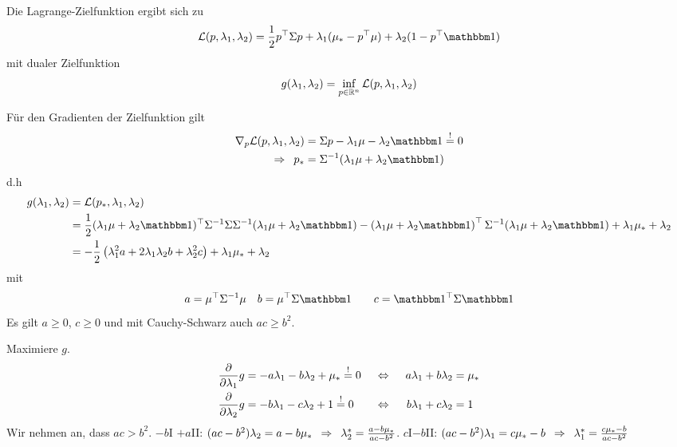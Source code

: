 Die Lagrange-Zielfunktion ergibt sich zu 
\begin{equation*}
	\mathcal{L}(p,\lambda_1,\lambda_2) = \frac{1}{2} \trans{p} \Sigma p + \lambda_1 (\mu_\ast - \trans{p} \mu) + \lambda_2 (1-\trans{p} \one)
\end{equation*}
mit dualer Zielfunktion
\begin{equation*}
	g(\lambda_1, \lambda_2) = \inf_{p \in \mathbb{R}^n} \mathcal{L}(p, \lambda_1, \lambda_2)
\end{equation*}

Für den Gradienten der Zielfunktion gilt
\begin{equation*}
	\begin{aligned}
		\nabla_p \mathcal{L}(p, \lambda_1, \lambda_2) &= \Sigma p - \lambda_1 \mu - \lambda_2 \one \overset{!}{=} 0 \\
		\follows p_\ast &= \Sigma^{-1} (\lambda_1 \mu + \lambda_2 \one)
	\end{aligned}
\end{equation*}
d.h 
\begin{align*}
	g(\lambda_1, \lambda_2) 
	&= \mathcal{L}(p_\ast, \lambda_1, \lambda_2) \\
	&= \frac{1}{2} \trans{(\lambda_1 \mu + \lambda_2 \one)} \Sigma^{-1} \Sigma \Sigma^{-1} (\lambda_1 \mu + \lambda_2 \one) - \transpose{\lambda_1 \mu + \lambda_2 \one} \Sigma^{-1} (\lambda_1 \mu + \lambda_2 \one) + \lambda_1 \mu_\ast + \lambda_2 \\
	&= -\frac{1}{2} \brackets{\lambda_1^2 a + 2 \lambda_1 \lambda_2 b + \lambda_2^2 c} + \lambda_1 \mu_\ast + \lambda_2
\end{align*}
mit
\begin{equation*}
	a = \trans{\mu} \Sigma^{-1} \mu \quad b = \trans{\mu} \Sigma \one \qquad c = \trans{\one} \Sigma \one
\end{equation*}
Es gilt $a \ge 0$, $c \ge 0$ und mit Cauchy-Schwarz auch $ac \ge b^2$.

Maximiere $g$.
\begin{align*}
	\frac{\partial}{\partial \lambda_1 } g &= -a \lambda_1 - b \lambda_2 + \mu_\ast \overset{!}{=} 0 &\enskip \Leftrightarrow \enskip&& a \lambda_1 + b \lambda_2 &= \mu_\ast \\
	\frac{\partial}{\partial \lambda_2 } g &= -b \lambda_1 -c \lambda_2 + 1 \overset{!}{=} 0 &\enskip \Leftrightarrow \enskip&& b \lambda_1 + c \lambda_2 &= 1
\end{align*}
Wir nehmen an, dass $ac > b^2$.
$-b$I $+a$II: $(ac - b^2) \lambda_2 = a - b \mu_\ast \enskip \Rightarrow \enskip \lambda_2^\ast = \frac{a - b \mu_\ast}{ac - b^2}$.
$c$I$-b$II: $(ac - b^2) \lambda_1 = c\mu_\ast - b \enskip \Rightarrow \enskip \lambda_1^\ast = \frac{c \mu_\ast - b}{ac - b^2}$

